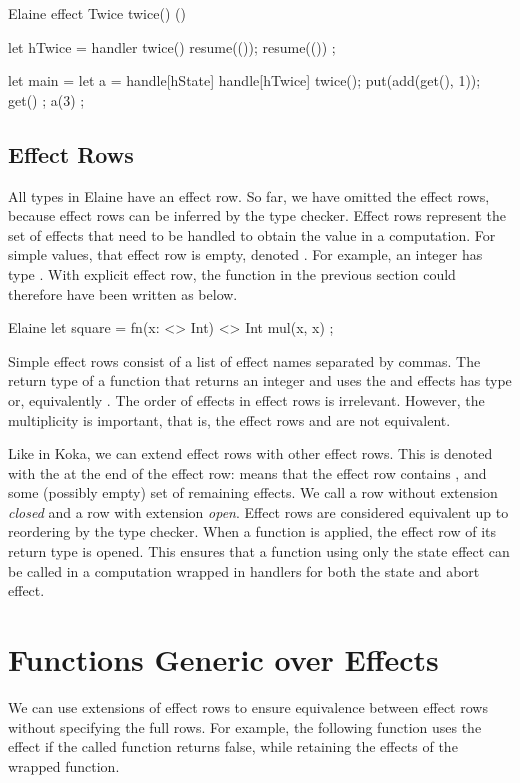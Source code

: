 \begin{lst}{Elaine}
effect Twice {
    twice() ()
}

let hTwice = handler {
    twice() {
        resume(());
        resume(())
    }
};

let main = {
    let a = handle[hState] handle[hTwice] {
        twice();
        put(add(get(), 1));
        get()
    };
    a(3)
};
\end{lst}

\subsection{Effect Rows}

All types in Elaine have an effect row. So far, we have omitted the effect rows, because effect rows can be inferred by the type checker. Effect rows represent the set of effects that need to be handled to obtain the value in a computation. For simple values, that effect row is empty, denoted \el{<>}. For example, an integer has type . With explicit effect row, the  function in the previous section could therefore have been written as below.

\begin{lst}{Elaine}
let square = fn(x: <> Int) <> Int {
    mul(x, x)
};
\end{lst}
%
Simple effect rows consist of a list of effect names separated by commas. The return type of a function that returns an integer and uses the  and  effects has type  or, equivalently . The order of effects in effect rows is irrelevant. However, the multiplicity is important, that is, the effect rows  and  are not equivalent.

Like in Koka, we can extend effect rows with other effect rows. This is denoted with the \el{|} at the end of the effect row:  means that the effect row contains ,  and some (possibly empty) set of remaining effects. We call a row without extension \emph{closed} and a row with extension \emph{open}. Effect rows are considered equivalent up to reordering by the type checker. When a function is applied, the effect row of its return type is opened. This ensures that a function using only the state effect can be called in a computation wrapped in handlers for both the state and abort effect.

\section{Functions Generic over Effects}
We can use extensions of effect rows to ensure equivalence between effect rows without specifying the full rows. For example, the following function uses the  effect if the called function returns false, while retaining the effects of the wrapped function.

